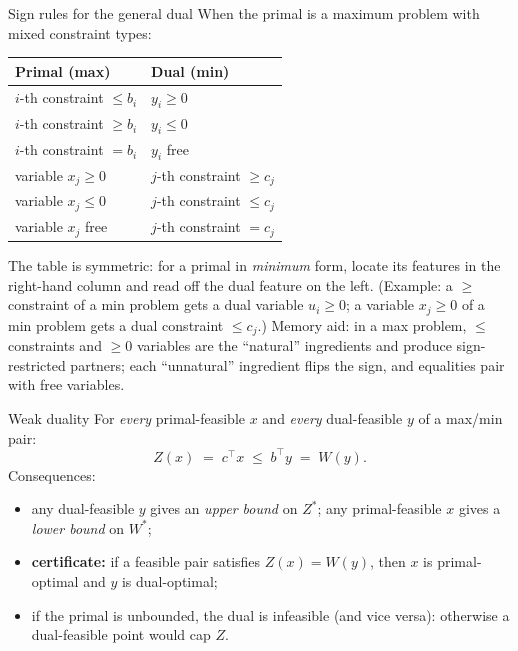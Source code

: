 \begin{rulebox}{Sign rules for the general dual}
When the primal is a maximum problem with mixed constraint types:
\begin{center}
\begin{tabular}{l|l}
\textbf{Primal (max)} & \textbf{Dual (min)}\\
\hline
$i$-th constraint $\le b_{i}$ & $y_{i}\ge 0$\\
$i$-th constraint $\ge b_{i}$ & $y_{i}\le 0$\\
$i$-th constraint $= b_{i}$   & $y_{i}$ free\\
\hline
variable $x_{j}\ge 0$ & $j$-th constraint $\ge c_{j}$\\
variable $x_{j}\le 0$ & $j$-th constraint $\le c_{j}$\\
variable $x_{j}$ free & $j$-th constraint $= c_{j}$\\
\end{tabular}
\end{center}
The table is symmetric: for a primal in \emph{minimum} form, locate its
features in the right-hand column and read off the dual feature on the
left. (Example: a $\ge$ constraint of a min problem gets a dual variable
$u_{i}\ge 0$; a variable $x_{j}\ge 0$ of a min problem gets a dual
constraint $\le c_{j}$.) Memory aid: in a max problem, $\le$ constraints
and $\ge 0$ variables are the ``natural'' ingredients and produce
sign-restricted partners; each ``unnatural'' ingredient flips the sign,
and equalities pair with free variables.
\end{rulebox}

\begin{rulebox}{Weak duality}
For \emph{every} primal-feasible $x$ and \emph{every} dual-feasible $y$ of
a max/min pair:
\[
  Z(x) \;=\; c^{\top}x \;\le\; b^{\top}y \;=\; W(y) .
\]
Consequences:
\begin{itemize}[leftmargin=1.6em,itemsep=0.3ex]
  \item any dual-feasible $y$ gives an \emph{upper bound} on $Z^{*}$; any
        primal-feasible $x$ gives a \emph{lower bound} on $W^{*}$;
  \item \textbf{certificate:} if a feasible pair satisfies
        $Z(x)=W(y)$, then $x$ is primal-optimal and $y$ is dual-optimal;
  \item if the primal is unbounded, the dual is infeasible (and vice
        versa): otherwise a dual-feasible point would cap $Z$.
\end{itemize}
\end{rulebox}

